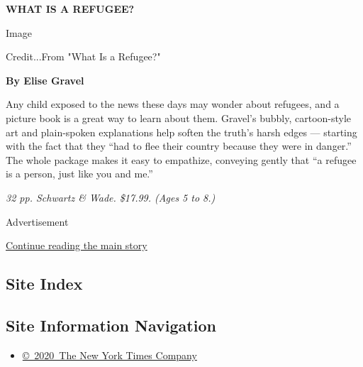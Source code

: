 \textbf{WHAT IS A REFUGEE?}

Image

Credit...From "What Is a Refugee?"

\textbf{By Elise Gravel}

Any child exposed to the news these days may wonder about refugees, and
a picture book is a great way to learn about them. Gravel's bubbly,
cartoon-style art and plain-spoken explanations help soften the truth's
harsh edges --- starting with the fact that they ``had to flee their
country because they were in danger.'' The whole package makes it easy
to empathize, conveying gently that ``a refugee is a person, just like
you and me.''

\emph{32 pp. Schwartz \& Wade. \$17.99. (Ages 5 to 8.)}

Advertisement

\protect\hyperlink{after-bottom}{Continue reading the main story}

\hypertarget{site-index}{%
\subsection{Site Index}\label{site-index}}

\hypertarget{site-information-navigation}{%
\subsection{Site Information
Navigation}\label{site-information-navigation}}

\begin{itemize}
\tightlist
\item
  \href{https://help.nytimes3xbfgragh.onion/hc/en-us/articles/115014792127-Copyright-notice}{©~2020~The
  New York Times Company}
\end{itemize}


